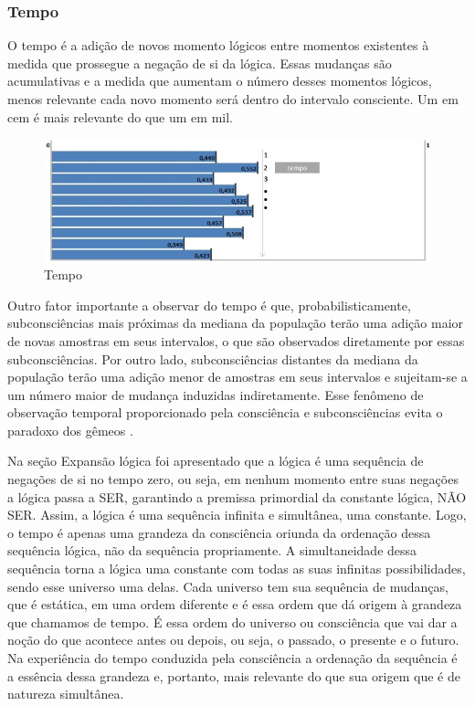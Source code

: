 \subsubsection{Tempo}
O tempo é a adição de novos momento lógicos entre momentos existentes à medida que prossegue a negação de si da lógica. Essas mudanças são acumulativas e a medida que aumentam o número desses momentos lógicos, menos relevante cada novo momento será dentro do intervalo consciente. Um em cem é mais relevante do que um em mil. 
	\begin{figure}[H]
	\caption{Tempo}
	\label{fig:consciousness_time}
	\centering
	\includegraphics[scale=.8]{sections/images/consciousness_time.jpg}
	\end{figure}

Outro fator importante a observar do tempo é que, probabilisticamente, subconsciências mais próximas da mediana da população terão uma adição maior de novas amostras em seus intervalos, o que são observados diretamente por essas subconsciências. Por outro lado, subconsciências distantes da mediana da população terão uma adição menor de amostras em seus intervalos e sujeitam-se a um número maior de mudança induzidas indiretamente. Esse fenômeno de observação temporal proporcionado pela consciência e subconsciências evita o paradoxo dos gêmeos \cite{brasilescola_paradoxo_gemeos}.

Na seção Expansão lógica foi apresentado que a lógica é uma sequência de negações de si no tempo zero, ou seja, em nenhum momento entre suas negações a lógica passa a SER, garantindo a premissa primordial da constante lógica, NÃO SER. Assim, a lógica é uma sequência infinita e simultânea, uma constante.
Logo, o tempo é apenas uma grandeza da consciência oriunda da ordenação dessa sequência lógica, não da sequência propriamente. A simultaneidade dessa sequência torna a lógica uma constante com todas as suas infinitas possibilidades, sendo esse universo uma delas. Cada universo tem sua sequência de mudanças, que é estática, em uma ordem diferente e é essa ordem que dá origem à grandeza que chamamos de tempo. É essa ordem do universo ou consciência que vai dar a noção do que acontece antes ou depois, ou seja, o passado, o presente e o futuro.
Na experiência do tempo conduzida pela consciência a ordenação da sequência é a essência dessa grandeza e, portanto, mais relevante do que sua origem que é de natureza simultânea.

